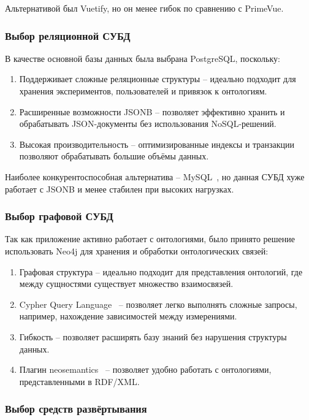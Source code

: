 Альтернативой был Vuetify, но он менее гибок по сравнению с PrimeVue.

\subsubsection{Выбор реляционной СУБД}

В качестве основной базы данных была выбрана PostgreSQL, поскольку:
\begin{enumerate}
    \item Поддерживает сложные реляционные структуры -- идеально подходит для хранения экспериментов, пользователей и привязок к онтологиям.
    \item Расширенные возможности JSONB -- позволяет эффективно хранить и обрабатывать JSON-документы без использования NoSQL-решений.
    \item Высокая производительность -- оптимизированные индексы и транзакции позволяют обрабатывать большие объёмы данных.
\end{enumerate}

Наиболее конкурентоспособная альтернатива – MySQL~\cite{DB:MySQL}, но данная СУБД хуже работает с JSONB и менее стабилен при высоких нагрузках.

\subsubsection{Выбор графовой СУБД}

Так как приложение активно работает с онтологиями, было принято решение использовать Neo4j для хранения и обработки онтологических связей:
\begin{enumerate}
    \item Графовая структура -- идеально подходит для представления онтологий, где между сущностями существует множество взаимосвязей.
    \item Cypher Query Language~\cite{QueryLang:CypherQL} -- позволяет легко выполнять сложные запросы, например, нахождение зависимостей между измерениями.
    \item Гибкость -- позволяет расширять базу знаний без нарушения структуры данных.
    \item Плагин neosemantics~\cite{Library:NeoSemantics} – позволяет удобно работать с онтологиями, представленными в RDF/XML.
\end{enumerate}

\subsubsection{Выбор средств развёртывания}

